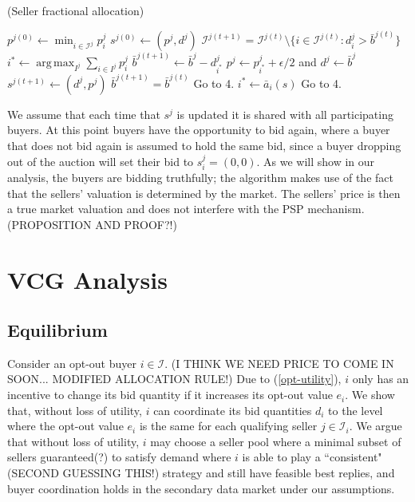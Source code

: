 \documentclass[12pt]{article}
\theoremstyle{definition}
\newcommand{\mcI}{\mathcal{I}}
\DeclareMathOperator*{\argmax}{arg\,max}
\begin{document}
\begin{multicols}{2}
\begin{algorithm}[H]
\caption{(Seller fractional allocation)}
\begin{algorithmic}[1]
\State $p^{j(0)} \gets \min_{i\in\mcI^j} p_i^j$
\State $s^{j(0)} \gets (p^j, d^j)$
\State $\mcI^{j(t+1)} = \mcI^{j(t)}\setminus \lbrace i \in \mcI^{j(t)}: d_i^j >
\bar{b}^{j(t)}\rbrace$
\State $ i^* \gets \displaystyle\argmax_{I^j}\sum_{i\in I^j} p_i^j$ 
\State $\bar{b}^{j(t+1)} \gets \bar{b}^j - d_{i^*}^{j}$
\State $p^j \gets p_{i^*}^j+\epsilon/2$ and $d^j \gets \bar{b}^j$
\State $s^{j(t+1)} \gets (d^j, p^j)$
\State $\bar{b}^{j(t+1)} = \bar{b}^{j(t)}$
\State Go to 4.
\Else
\State $i^* \gets \bar a_i(s)$
\State Go to 4.
\EndIf
\EndWhile
\end{algorithmic}
\end{algorithm}
We assume that each time that $s^j$ is updated it is shared with all
participating buyers. At this point buyers have the opportunity to bid again,
where a buyer that does not bid again is assumed to hold the same bid, since a
buyer dropping out of the auction will set their bid to $s_i^j=(0,0)$. As we will show in our analysis, the buyers are bidding truthfully; the
algorithm makes use of the fact that the sellers' valuation is determined by the market.
The sellers' price is then a true market valuation and does not interfere with
the PSP mechanism. (PROPOSITION AND PROOF?!)

\section{VCG Analysis}\label{analysis}
\subsection{Equilibrium}

Consider an opt-out buyer $i\in\mcI$. 
(I THINK WE NEED PRICE TO COME IN SOON... MODIFIED ALLOCATION RULE!)
Due to (\ref{opt-utility}), $i$ only has an incentive to change its bid
quantity if it increases its opt-out value $e_i$. 
We show that, without loss of utility, $i$ can coordinate its
bid quantities $d_i$ to the level where the opt-out value $e_i$ 
 is the same for each qualifying seller $j \in\mcI_i$. We argue
that without loss of utility, $i$ may choose a seller pool where a minimal subset
of sellers guaranteed(?) to satisfy demand where $i$ is able to play a
``consistent" (SECOND GUESSING THIS!)
strategy and still have feasible best replies, and buyer
coordination holds in the secondary data market under our assumptions.


\end{multicols}
\end{document}
